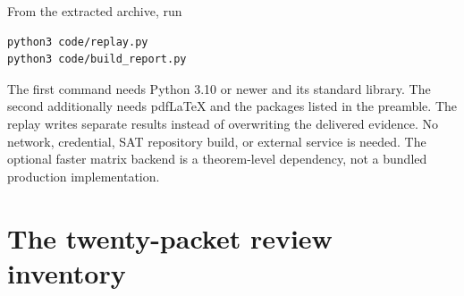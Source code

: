 \documentclass[11pt,letterpaper]{article}
\theoremstyle{remark}\newtheorem{remark}[theorem]{Remark}
\begin{document}
From the extracted archive, run
\begin{verbatim}
python3 code/replay.py
python3 code/build_report.py
\end{verbatim}
The first command needs Python 3.10 or newer and its standard library. The
second additionally needs pdfLaTeX and the packages listed in the preamble.
The replay writes separate results instead of overwriting the delivered
evidence. No network, credential, SAT repository build, or external
service is needed. The optional faster matrix backend is a theorem-level
dependency, not a bundled production implementation.

\appendix
\section{The twenty-packet review inventory}
\label{app:inventory}
\small
\end{document}
